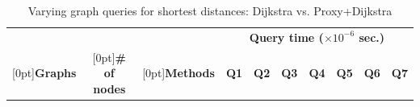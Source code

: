 \begin{table}[t!]
\caption{Varying graph queries  for shortest distances: Dijkstra  vs. Proxy+Dijkstra}\label{tab:performance_dist_queries_dj}
\vspace{-2ex}
\begin{center}

\begin{tabular}{|c|c|c||r|r|r|r|r|r|r|}
\hline
  & &  & \multicolumn{7}{c|}{\bf Query time ($\times 10^{-6}$ sec.)} \\
\cline{4-10}

\raisebox{1.5ex}[0pt]{\bf Graphs}&\raisebox{1.5ex}[0pt]{\bf \# of nodes}  & \raisebox{1.5ex}[0pt]{\bf Methods} & {\bf Q1} & {\bf Q2} & {\bf Q3} & {\bf Q4} & {\bf Q5} & {\bf Q6} & {\bf Q7}  \\ \hline \hline


\end{tabular}
\end{center}
\end{table}
